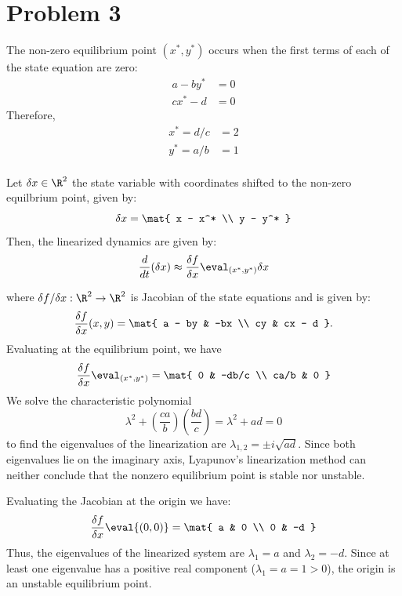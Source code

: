 \documentclass{homework}
\begin{document}
\section{Problem 3}
\begin{letterenum}
\item The non-zero equilibrium point $(x^*, y^*)$ occurs when the first terms of
each of the state equation are zero:
\begin{align*}
    a - by^* &= 0 \\
    cx^* - d &= 0
\end{align*}
Therefore,
\begin{align*}
    x^* = d/c &= 2 \\
    y^* = a/b &= 1 \\
\end{align*}

\item Let $\delta x\in\R^2$ the state variable with coordinates shifted to
the non-zero equilbrium point, given by:
\begin{equation*}
    \delta x = \mat{
        x - x^* \\ y - y^*
    }
\end{equation*}
Then, the linearized dynamics are given by:
\begin{equation*}
    \frac{d}{dt} (\delta x) \approx
        \frac{\delta f}{\delta x} \eval_{(x^*, y^*)} \delta x
\end{equation*}

where $\delta f/\delta x: \R^2 \to \R^2$ is Jacobian of the state equations and
is given by:
\begin{equation*}
    \frac{\delta f}{\delta x}(x, y) = \mat{
        a - by & -bx \\
        cy & cx - d
    }.
\end{equation*}
Evaluating at the equilibrium point, we have
\begin{equation*}
    \frac{\delta f}{\delta x}\eval_{(x^*, y^*)} = \mat{
        0 & -db/c \\
        ca/b & 0
    }
\end{equation*}
We solve the characteristic polynomial
\begin{equation*}
    \lambda^2 + (\frac{ca}{b})(\frac{bd}{c}) =
        \lambda^2 + ad = 0
\end{equation*}
to find the eigenvalues of the linearization are $\lambda_{1,2} = \pm i \sqrt{ad}$.
Since both eigenvalues lie on the imaginary axis, Lyapunov's linearization method
can neither conclude that the nonzero equilibrium point is stable nor unstable.

\item Evaluating the Jacobian at the origin we have:
\begin{equation*}
    \frac{\delta f}{\delta x}\eval{(0, 0)} = \mat{
        a & 0 \\
        0 & -d
    }
\end{equation*}
Thus, the eigenvalues of the linearized system are $\lambda_1 = a$ and 
$\lambda_2 = -d$. Since at least one eigenvalue has a positive real component
($\lambda_1 = a = 1 > 0$), the origin is an unstable equilibrium point.
    
\end{letterenum}
\end{document}
